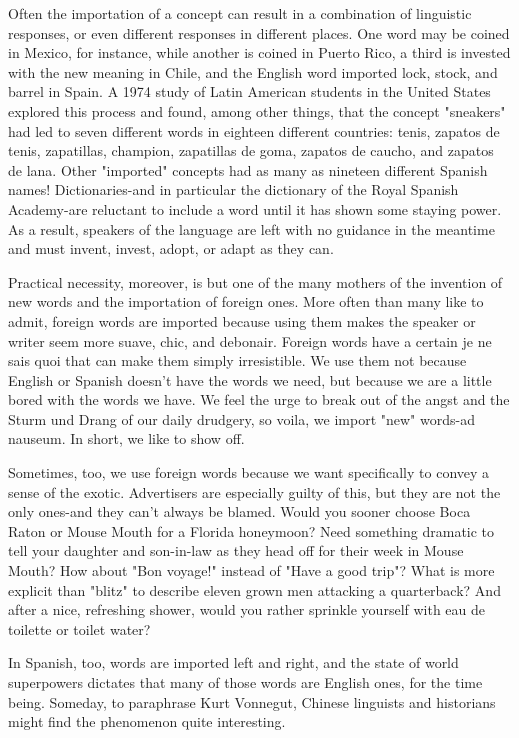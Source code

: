 \documentclass[14pt,a4paper,oneside]{memoir}
\begin{document}
{{{{Often the importation of a concept can result in a combination
of linguistic responses, or even different responses in different places.
One word may be coined in Mexico, for instance, while another is
coined in Puerto Rico, a third is invested with the new meaning in
Chile, and the English word imported lock, stock, and barrel in Spain.
A 1974 study of Latin American students in the United States explored
this process and found, among other things, that the concept "sneakers" had led to seven different words in eighteen different countries:
tenis, zapatos de tenis, zapatillas, champion, zapatillas de goma, zapatos de caucho, and zapatos de lana. Other "imported" concepts had
as many as nineteen different Spanish names! Dictionaries-and in
particular the dictionary of the Royal Spanish Academy-are reluctant
to include a word until it has shown some staying power. As a result,
speakers of the language are left with no guidance in the meantime and
must invent, invest, adopt, or adapt as they can.

Practical necessity, moreover, is but one of the many mothers
of the invention of new words and the importation of foreign ones.
More often than many like to admit, foreign words are imported because using them makes the speaker or writer seem more suave, chic,
and debonair. Foreign words have a certain je ne sais quoi that can
make them simply irresistible. We use them not because English or
Spanish doesn't have the words we need, but because we are a little
bored with the words we have. We feel the urge to break out of the
angst and the Sturm und Drang of our daily drudgery, so voila, we import "new" words-ad nauseum. In short, we like to show off.

Sometimes, too, we use foreign words because we want specifically to convey a sense of the exotic. Advertisers are especially
guilty of this, but they are not the only ones-and they can't always
be blamed. Would you sooner choose Boca Raton or Mouse Mouth for
a Florida honeymoon? Need something dramatic to tell your daughter
and son-in-law as they head off for their week in Mouse Mouth? How
about "Bon voyage!" instead of "Have a good trip"? What is more explicit than "blitz" to describe eleven grown men attacking a quarterback? And after a nice, refreshing shower, would you rather sprinkle
yourself with eau de toilette or toilet water?

In Spanish, too, words are imported left and right, and the
state of world superpowers dictates that many of those words are English ones, for the time being. Someday, to paraphrase Kurt Vonnegut,
Chinese linguists and historians might find the phenomenon quite
interesting.

}}}}
\end{document}
